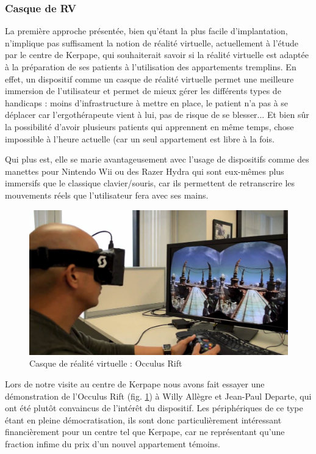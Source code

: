\subsubsection{Casque de RV}
La première approche présentée, bien qu'étant la plus facile d'implantation, n'implique pas suffisament la notion de réalité virtuelle, actuellement à l'étude par le centre de Kerpape, qui souhaiterait savoir si la réalité virtuelle est adaptée à la préparation de ses patients à l’utilisation des appartements tremplins. 
En effet, un dispositif comme un casque de réalité virtuelle permet une meilleure immersion de l'utilisateur et permet de mieux gérer les différents types de handicaps : moins d'infrastructure à mettre en place, le patient n'a pas à se déplacer car l'ergothérapeute vient à lui, pas de risque de se blesser...
Et bien sûr la possibilité d'avoir plusieurs patients qui apprennent en même temps, chose impossible à l'heure actuelle (car un seul appartement est libre à la fois. 

Qui plus est, elle se marie avantageusement avec l'usage de dispositifs comme des manettes pour Nintendo Wii ou des Razer Hydra qui sont eux-mêmes plus immersifs que le classique clavier/souris, car ils permettent de retranscrire les mouvements réels que l'utilisateur fera avec ses mains. \newline
\begin{figure}
  \centering
  \includegraphics[scale=0.3]{2-Specifications/img-utilisateur/occulus.jpg}
	\caption{Casque de réalité virtuelle : Occulus Rift}
	\label{occulus_reparo}
\end{figure}
Lors de notre visite au centre de Kerpape nous avons fait essayer une démonstration de l'Occulus Rift (fig. \ref{occulus_reparo}) à Willy Allègre et Jean-Paul Departe, qui ont été plutôt convaincus de l'intérêt du dispositif. 
Les périphériques de ce type étant en pleine démocratisation, ils sont donc particulièrement intéressant financièrement pour un centre tel que Kerpape, car ne représentant qu'une fraction infime du prix d'un nouvel appartement témoins.


